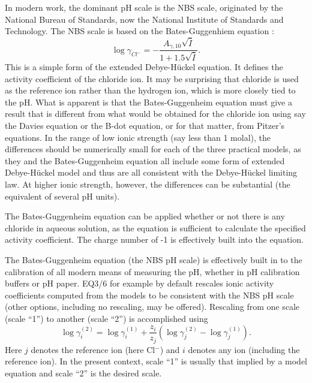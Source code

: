 In modern work, the dominant pH scale is the NBS scale, originated by
the National Bureau of Standards, now the National Institute of
Standards and Technology. The NBS scale is based on the
Bates-Guggenhiem equation \citep{bates-1964}:
%
\begin{equation}
  \log \gamma _{Cl^{-} } =-\frac{A_{\gamma ,10} \sqrt{\bar{I}}}{1+1.5\sqrt{\bar{I} } } .
\end{equation}
%
This is a simple form of the extended Debye-H\"{u}ckel equation. It
defines the activity coefficient of the chloride ion. It may be
surprising that chloride is used as the reference ion rather than the
hydrogen ion, which is more closely tied to the pH.  What is apparent is that the Bates-Guggenheim
equation must give a result that is different from what would be
obtained for the chloride ion using say the Davies equation or the
B-dot equation, or for that matter, from Pitzer's equations. In the
range of low ionic strength (say less than 1 molal), the differences
should be numerically small for each of the three practical models, as
they and the Bates-Guggenheim equation all include some form of
extended Debye-H\"{u}ckel model and thus are all consistent with the
Debye-H\"{u}ckel limiting law.  At higher ionic strength, however, the differences can be substantial (the equivalent of several pH units). 

The Bates-Guggenheim equation can be applied whether or not there is
any chloride in aqueous solution, as the equation is sufficient to
calculate the specified activity coefficient. The charge number of -1
is effectively built into the equation. 

The Bates-Guggenheim equation (the NBS pH scale) is effectively built
in to the calibration of all modern means of measuring the pH, whether
in pH calibration buffers or pH paper. EQ3/6 for example by default
rescales ionic activity coefficients computed from the models to be
consistent with the NBS pH scale (other options, including no
rescaling, may be offered). Rescaling from one scale (scale ``1'') to
another (scale ``2'') is accomplished using 
%
\begin{equation}
   \log \gamma_{i}^{(2)} 
     = \log \gamma_{i}^{(1)} 
     + \frac{z_{i}}{z_{j}} 
       \left( 
         \log \gamma_{j}^{(2)} - \log \gamma_{j}^{(1)} 
       \right).
\end{equation}
%
Here $j$ denotes the reference ion (here Cl$^-$) and $i$ denotes any ion
(including the reference ion). In the present context, scale ``1'' is
usually that implied by a model equation and scale ``2'' is the
desired scale.

